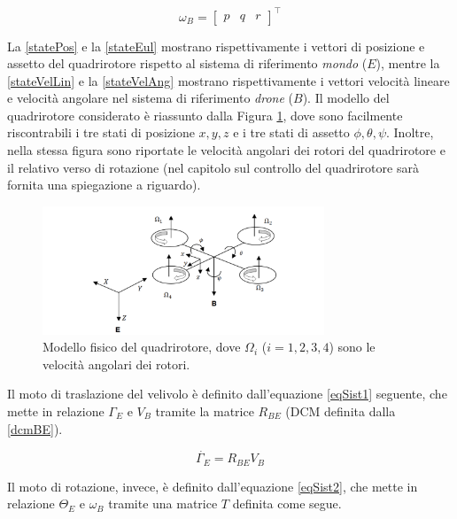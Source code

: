\begin{equation}
\omega_B = \begin{bmatrix}
p & q & r 
\end{bmatrix}^\top
\label{stateVelAng}
\end{equation}

La \ref{statePos} e la \ref{stateEul} mostrano rispettivamente i vettori di posizione e assetto del quadrirotore rispetto al sistema di riferimento \emph{mondo} ($E$), mentre la \ref{stateVelLin} e la \ref{stateVelAng} mostrano rispettivamente i vettori velocità lineare e velocità angolare nel sistema di riferimento \emph{drone} ($B$). Il modello del quadrirotore considerato è riassunto dalla Figura \ref{fig:quadModel}, dove sono facilmente riscontrabili i tre stati di posizione $x, y, z$ e i tre stati di assetto $\phi, \theta, \psi$. Inoltre, nella stessa figura sono riportate le velocità angolari dei rotori del quadrirotore e il relativo verso di rotazione (nel capitolo sul controllo del quadrirotore sarà fornita una spiegazione a riguardo).

\begin{figure}[H]
    \centering
    \includegraphics[width=0.75\textwidth]{gfx/quad_model}
    \caption[Modello fisico del quadrirotore, con velocità angolari dei rotori.]{Modello fisico del quadrirotore, dove $\Omega_i$ ($i = 1,2,3,4$) sono le velocità angolari dei rotori.}
    \label{fig:quadModel}
\end{figure}

Il moto di traslazione del velivolo è definito dall'equazione \ref{eqSist1} seguente, che mette in relazione $\Gamma_E$ e $V_B$ tramite la matrice $R_{BE}$ (\acs{DCM} definita dalla \ref{dcmBE}). 

\begin{equation}
	\Dot{\Gamma_E} = R_{BE}V_B
	\label{eqSist1}
\end{equation}

Il moto di rotazione, invece, è definito dall'equazione \ref{eqSist2}, che mette in relazione $\Theta_E$ e $\omega_B$ tramite una matrice $T$ definita come segue.

